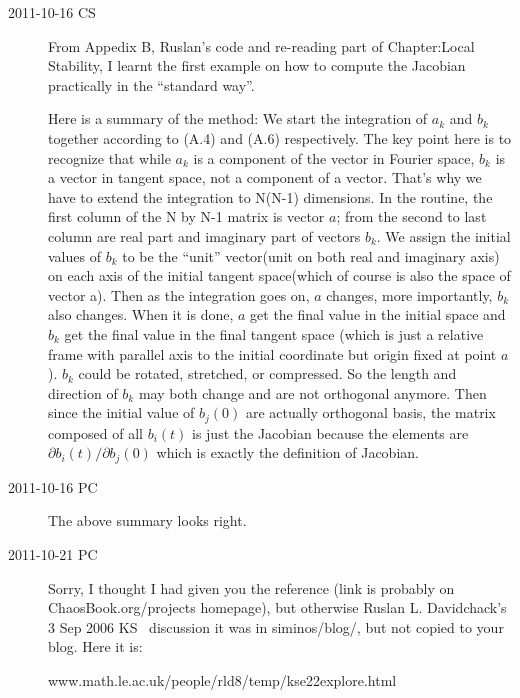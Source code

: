 \begin{description}
\item[2011-10-16 CS]
From Appedix B, Ruslan's code and re-reading part of Chapter:Local Stability,
I learnt the first example on how to compute the Jacobian practically in the
``standard way''.

Here is a summary of the method:
We start the integration of ${a_k}$ and ${b_k}$ together according to
(A.4) and (A.6) respectively. The key point here is to recognize that
while ${a_k}$ is a component of the vector in Fourier space, $b_k$ is a
vector in tangent space, not a component of a vector. That's why we have
to extend the integration to N(N-1) dimensions. In the routine, the first
column of the N by N-1 matrix is vector $a$; from the second to last
column are real part and imaginary part of vectors ${b_k}$. We assign the
initial values of ${b_k}$ to be the ``unit'' vector(unit on both real and
imaginary axis) on each axis of the initial tangent space(which of course
is also the space of vector a). Then as the integration goes on, $a$
changes, more importantly, ${b_k}$ also changes. When it is done, $a$ get
the final value in the initial space and ${b_k}$ get the final value in
the final tangent space (which is just a relative frame with parallel axis
to the initial coordinate but origin fixed at point $a$). ${b_k}$ could
be rotated, stretched, or compressed. So the length and direction of
${b_k}$ may both change and are not orthogonal anymore. Then since the
initial value of ${b_j(0)}$ are actually orthogonal basis, the matrix
composed of all ${b_i(t)}$ is just the Jacobian because the elements are
$\partial{b_i(t)}/\partial{b_j(0)}$ which is exactly the definition of
Jacobian.

\item[2011-10-16 PC] The above summary looks right.

\item[2011-10-21 PC] Sorry, I thought I had given you
the reference (link is probably on ChaosBook.org/projects
homepage), but otherwise Ruslan L. Davidchack's 3 Sep 2006
KS \eqva\ discussion it was in siminos/blog/, but not copied to
your blog. Here it is:

{www.math.le.ac.uk/people/rld8/temp/kse22explore.html}

\end{description}
